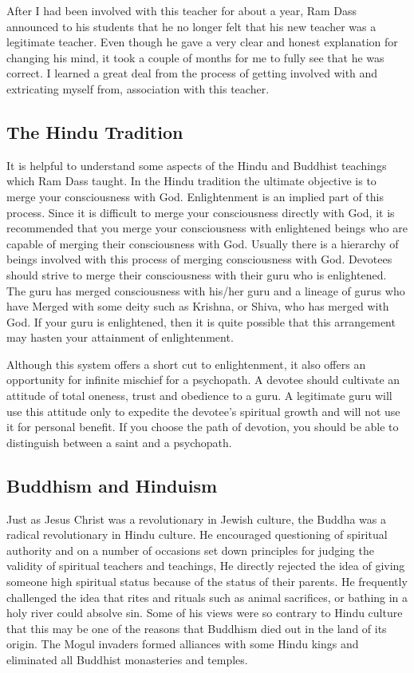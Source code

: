 \documentclass[a5paper,10pt,english]{book}
\begin{document}
\sphinxAtStartPar
After I had been involved with this teacher for about a year, Ram Dass
announced to his students that he no longer felt that his new teacher
was a legitimate teacher. Even though he gave a very clear and honest
explanation for changing his mind, it took a couple of months for me to
fully see that he was correct. I learned a great deal from the process
of getting involved with and extricating myself from, association with
this teacher.


\subsection{The Hindu Tradition}
\label{\detokenize{psychopaths:the-hindu-tradition}}
\sphinxAtStartPar
It is helpful to understand some aspects of the Hindu and Buddhist
teachings which Ram Dass taught. In the Hindu tradition the ultimate
objective is to merge your consciousness with God. Enlightenment is an
implied part of this process. Since it is difficult to merge your
consciousness directly with God, it is recommended that you merge your
consciousness with enlightened beings who are capable of merging their
consciousness with God. Usually there is a hierarchy of beings involved
with this process of merging consciousness with God. Devotees should
strive to merge their consciousness with their guru who is enlightened.
The guru has merged consciousness with his/her guru and a lineage of
gurus who have Merged with some deity such as Krishna, or Shiva, who has
merged with God. If your guru is enlightened, then it is quite possible
that this arrangement may hasten your attainment of enlightenment.

\sphinxAtStartPar
Although this system offers a short cut to enlightenment, it also offers
an opportunity for infinite mischief for a psychopath. A devotee should
cultivate an attitude of total oneness, trust and obedience to a guru. A
legitimate guru will use this attitude only to expedite the devotee’s
spiritual growth and will not use it for personal benefit. If you choose
the path of devotion, you should be able to distinguish between a saint
and a psychopath.


\subsection{Buddhism and Hinduism}
\label{\detokenize{psychopaths:buddhism-and-hinduism}}
\sphinxAtStartPar
Just as Jesus Christ was a revolutionary in Jewish culture, the Buddha
was a radical revolutionary in Hindu culture. He encouraged questioning
of spiritual authority and on a number of occasions set down principles
for judging the validity of spiritual teachers and teachings, He
directly rejected the idea of giving someone high spiritual status
because of the status of their parents. He frequently challenged the
idea that rites and rituals such as animal sacrifices, or bathing in a
holy river could absolve sin. Some of his views were so contrary to
Hindu culture that this may be one of the reasons that Buddhism died out
in the land of its origin. The Mogul invaders formed alliances with some
Hindu kings and eliminated all Buddhist monasteries and temples.
\end{document}
